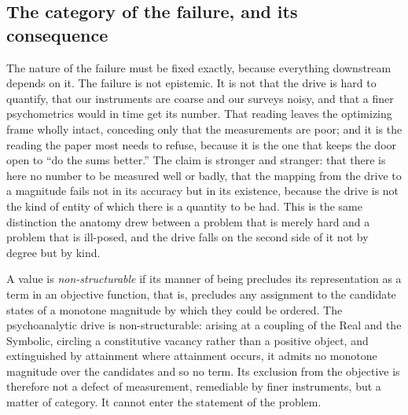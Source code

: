 \subsection*{The category of the failure, and its consequence}

The nature of the failure must be fixed exactly, because everything downstream depends on it. The failure is not epistemic. It is not that the drive is hard to quantify, that our instruments are coarse and our surveys noisy, and that a finer psychometrics would in time get its number. That reading leaves the optimizing frame wholly intact, conceding only that the measurements are poor; and it is the reading the paper most needs to refuse, because it is the one that keeps the door open to ``do the sums better.'' The claim is stronger and stranger: that there is here no number to be measured well or badly, that the mapping from the drive to a magnitude fails not in its accuracy but in its existence, because the drive is not the kind of entity of which there is a quantity to be had. This is the same distinction the anatomy drew between a problem that is merely hard and a problem that is ill-posed, and the drive falls on the second side of it not by degree but by kind.

\begin{claim}
A value is \emph{non-structurable} if its manner of being precludes its representation as a term in an objective function, that is, precludes any assignment to the candidate states of a monotone magnitude by which they could be ordered. The psychoanalytic drive is non-structurable: arising at a coupling of the Real and the Symbolic, circling a constitutive vacancy rather than a positive object, and extinguished by attainment where attainment occurs, it admits no monotone magnitude over the candidates and so no term. Its exclusion from the objective is therefore not a defect of measurement, remediable by finer instruments, but a matter of category. It cannot enter the statement of the problem.
\end{claim}

